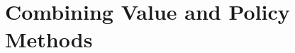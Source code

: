 \setcounter{chapter}{12}

\hypertarget{combining-value-and-policy-methods}{%
\chapter{Combining Value and Policy Methods}\label{combining-value-and-policy-methods}}
